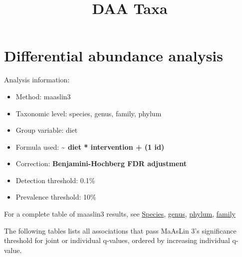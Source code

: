 \documentclass[
]{article}
\title{DAA Taxa}
\author{}
\date{}
\providecommand{\tightlist}{%
  \setlength{\itemsep}{0pt}\setlength{\parskip}{0pt}}\usepackage{longtable,booktabs,array}
\begin{document}
\maketitle


\section{Differential abundance
analysis}\label{differential-abundance-analysis}

Analysis information:

\begin{itemize}
\tightlist
\item
  Method: maaslin3
\item
  Taxonomic level: species, genus, family, phylum
\item
  Group variable: diet
\item
  Formula used: \textbf{\textasciitilde{} diet * intervention + (1
  \textbar{} id)}
\item
  Correction: \textbf{Benjamini-Hochberg FDR adjustment}
\item
  Detection threshold: 0.1\%
\item
  Prevalence threshold: 10\%
\end{itemize}

For a complete table of maaslin3 results, see
\href{https://github.com/openresearchlabs/OGB_project/blob/main/output/daa/daa_taxa/species/all_results.tsv}{Species},
\href{https://github.com/openresearchlabs/OGB_project/blob/main/output/daa/daa_taxa/genus/all_results.tsv}{genus},
\href{https://github.com/openresearchlabs/OGB_project/blob/main/output/daa/daa_taxa/phylum/all_results.tsv}{phylum},
\href{https://github.com/openresearchlabs/OGB_project/blob/main/output/daa/daa_taxa/family/all_results.tsv}{family}

The following tables lists all associations that pass MaAsLin 3's
significance threshold for joint or individual q-values, ordered by
increasing individual q-value.
\end{document}
